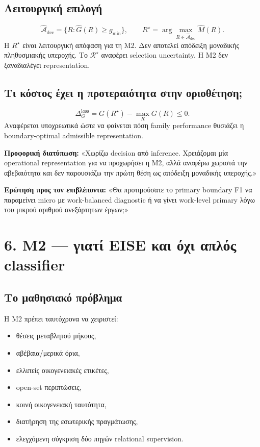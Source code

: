 \documentclass[9pt,a4paper]{extarticle}
\newcommand{\say}[1]{\begin{keybox}\textbf{Προφορική διατύπωση:} #1\end{keybox}}
\newcommand{\ask}[1]{\begin{warnbox}\textbf{Ερώτηση προς τον επιβλέποντα:} #1\end{warnbox}}
\begin{document}
\subsection*{Λειτουργική επιλογή}
\[
\widehat{\mathcal A}_{\mathrm{dec}}=\{R:\widehat G(R)\ge g_{\min}\},
\qquad
R^\star=\arg\max_{R\in\widehat{\mathcal A}_{\mathrm{dec}}}\widehat M(R).
\]
Η \(R^\star\) είναι λειτουργική απόφαση για τη M2. Δεν αποτελεί απόδειξη μοναδικής πληθυσμιακής υπεροχής. Το \(\mathcal R^\star\) αναφέρει selection uncertainty. Η M2 δεν ξαναδιαλέγει representation.

\subsection*{Τι κόστος έχει η προτεραιότητα στην οριοθέτηση;}
\[
\Delta_G^{\mathrm{loss}}=G(R^\star)-\max_R G(R)\le0.
\]
Αναφέρεται υποχρεωτικά ώστε να φαίνεται πόση family performance θυσιάζει η boundary-optimal admissible representation.

\say{«Χωρίζω decision από inference. Χρειάζομαι μία operational representation για να προχωρήσει η M2, αλλά αναφέρω χωριστά την αβεβαιότητα και δεν παρουσιάζω την πρώτη θέση ως απόδειξη μοναδικής υπεροχής.»}

\ask{«Θα προτιμούσατε το primary boundary F1 να παραμείνει micro με work-balanced diagnostic ή να γίνει work-level primary λόγω του μικρού αριθμού ανεξάρτητων έργων;»}

\newpage
\section*{6. M2 — γιατί EISE και όχι απλός classifier}

\subsection*{Το μαθησιακό πρόβλημα}
Η M2 πρέπει ταυτόχρονα να χειριστεί:
\begin{itemize}
\item θέσεις μεταβλητού μήκους,
\item αβέβαια/μερικά όρια,
\item ελλιπείς οικογενειακές ετικέτες,
\item open-set περιπτώσεις,
\item κοινή οικογενειακή ταυτότητα,
\item διατήρηση της εσωτερικής πραγμάτωσης,
\item ελεγχόμενη σύγκριση δύο πηγών relational supervision.
\end{itemize}
\end{document}

